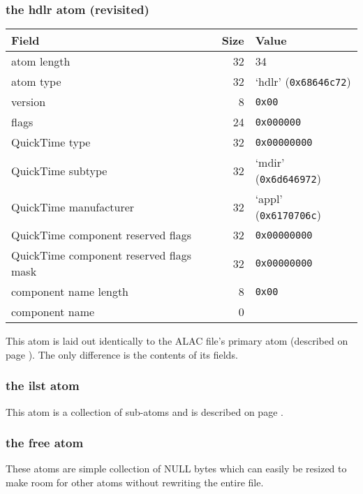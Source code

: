 \subsubsection{the hdlr atom (revisited)}

\begin{tabular}{|l|r|l|}
\hline
Field & Size & Value \\
\hline
atom length & 32 & 34 \\
atom type & 32 & `hdlr' (\texttt{0x68646c72}) \\
\hline
version & 8 & \texttt{0x00} \\
flags & 24 & \texttt{0x000000} \\
QuickTime type & 32 & \texttt{0x00000000} \\
QuickTime subtype & 32 & `mdir' (\texttt{0x6d646972}) \\
QuickTime manufacturer & 32 & `appl' (\texttt{0x6170706c}) \\
QuickTime component reserved flags & 32 & \texttt{0x00000000} \\
QuickTime component reserved flags mask & 32 & \texttt{0x00000000} \\
component name length & 8 & \texttt{0x00} \\
component name & 0 & \\
\hline
\end{tabular}

This atom is laid out identically to the ALAC file's primary
 atom (described on page \pageref{alac_hdlr}).
The only difference is the contents of its fields.

\subsubsection{the ilst atom}

This atom is a collection of  sub-atoms
and is described on page \pageref{m4a_meta}.

\subsubsection{the free atom}

These atoms are simple collection of NULL bytes which can easily be
resized to make room for other atoms without rewriting the entire file.

